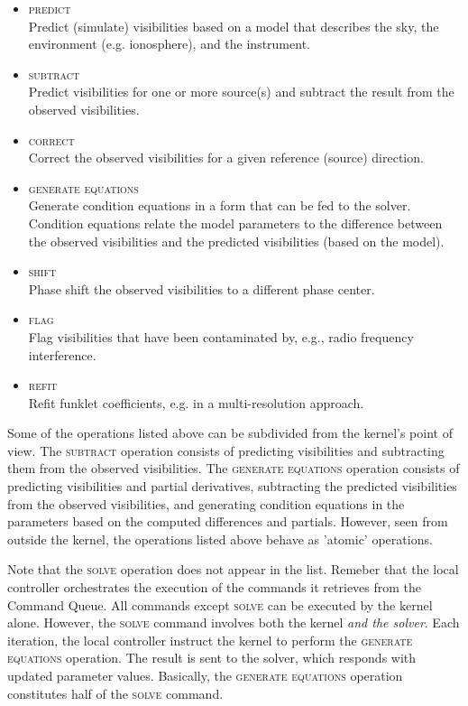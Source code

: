 \documentclass[10pt]{lofar}
\newcommand{\predict}{\textsc{predict}\xspace}
\newcommand{\subtract}{\textsc{subtract}\xspace}
\newcommand{\correct}{\textsc{correct}\xspace}
\newcommand{\solve}{\textsc{solve}\xspace}
\newcommand{\generate}{\textsc{generate equations}\xspace}
\newcommand{\refit}{\textsc{refit}\xspace}
\newcommand{\shift}{\textsc{shift}\xspace}
\newcommand{\flag}{\textsc{flag}\xspace}
\begin{document}
\begin{itemize}
\item \predict\\
Predict (simulate) visibilities based on a model that describes the sky, the
environment (e.g. ionosphere), and the instrument.
\item \subtract\\
Predict visibilities for one or more source(s) and subtract the result from the
observed visibilities.
\item \correct\\
Correct the observed visibilities for a given reference (source) direction.
\item \generate\\
Generate condition equations in a form that can be fed to the solver. Condition
equations relate the model parameters to the difference between the observed
visibilities and the predicted visibilities (based on the model).
\item \shift\\
Phase shift the observed visibilities to a different phase center.
\item \flag\\
Flag visibilities that have been contaminated by, e.g., radio frequency
interference.
\item \refit\\
Refit funklet coefficients, e.g. in a multi-resolution approach.
\end{itemize}

Some of the operations listed above can be subdivided from the kernel's point of
view. The \subtract operation consists of predicting visibilities and
subtracting them from the observed visibilities. The \generate operation
consists of predicting visibilities and partial derivatives, subtracting the
predicted visibilities from the observed visibilities, and generating condition
equations in the parameters based on the computed differences and partials.
However, seen from outside the kernel, the operations listed above behave as
'atomic' operations.

Note that the \solve operation does not appear in the list. Remeber that the
local controller orchestrates the execution of the commands it retrieves from
the Command Queue. All commands except \solve can be executed by the kernel
alone. However, the \solve command involves both the kernel \emph{and the
solver}. Each iteration, the local controller instruct the kernel to perform the
\generate operation. The result is sent to the solver, which responds with
updated parameter values. Basically, the \generate operation constitutes half of
the \solve command.
\end{document}
